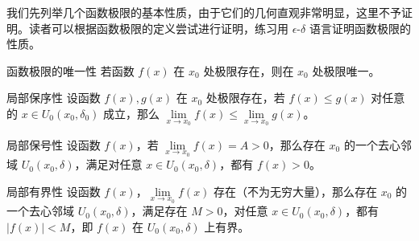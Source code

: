 

我们先列举几个函数极限的基本性质，由于它们的几何直观非常明显，这里不予证明。读者可以根据函数极限的定义尝试进行证明，练习用 $\epsilon$-$\delta$ 语言证明函数极限的性质。
\begin{theorem}{函数极限的唯一性}
  若函数 $f(x)$ 在 $x_0$ 处极限存在，则在 $x_0$ 处极限唯一。
\end{theorem}
\begin{theorem}{局部保序性}
设函数 $f(x),g(x)$ 在 $x_0$ 处极限存在，若 $f(x)\le g(x)$ 对任意的 $x\in U_0(x_0,\delta_0)$ 成立，那么 $\lim\limits_{x\rightarrow x_0} f(x)\le \lim\limits_{x\rightarrow x_0}g(x)$。
\end{theorem}
\begin{theorem}{局部保号性}
设函数 $f(x)$，若 $\lim\limits_{x\rightarrow x_0}f(x)=A>0$，那么存在 $x_0$ 的一个去心邻域 $U_0(x_0,\delta)$，满足对任意 $x\in U_0(x_0,\delta)$，都有 $f(x)>0$。
\end{theorem}
\begin{theorem}{局部有界性}
设函数 $f(x)$，$\lim\limits_{x\rightarrow x_0}f(x)$ 存在（不为无穷大量），那么存在 $x_0$ 的一个去心邻域  $U_0(x_0,\delta)$，满足存在 $M>0$，对任意 $x\in U_0(x_0,\delta)$，都有 $|f(x)|<M$，即 $f(x)$ 在 $U_0(x_0,\delta)$ 上有界。
\end{theorem}
